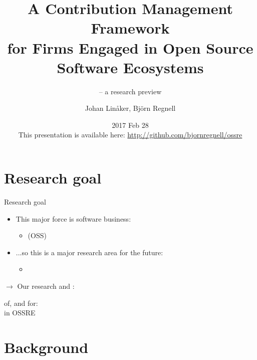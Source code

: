 \documentclass{slideclass}
\title[Open Source Software Requirements Engineering (OSSRE)]
{\textbf{A Contribution Management Framework}\\{\small for Firms
Engaged in Open Source Software Ecosystems}}
\subtitle{\small-- a research preview}
\author{Johan Linåker, Björn Regnell}
\institute{Lund University}
\date{2017 Feb 28 \\ 
\vspace{2em}
{\footnotesize This presentation is available here: \url{http://github.com/bjornregnell/ossre}}
}
\begin{document}
\frame{\titlepage}
\frame{\tableofcontents}

\section{Research goal}
\begin{Slide}{Research goal}
\begin{itemize}
\item This major force is  software business:\pause
\begin{itemize}
\item[]  (OSS)\pause
\end{itemize}
\item ...so this is a major research area for the future:\pause
\begin{itemize}
\item[] \pause
\end{itemize}
\end{itemize}
\vspace{1em}

$\rightarrow$ Our research  and :\\
\begin{shaded}
 of, and  for: \\
 in OSSRE
\end{shaded}



\end{Slide}

\section{Background}%
\end{document}
